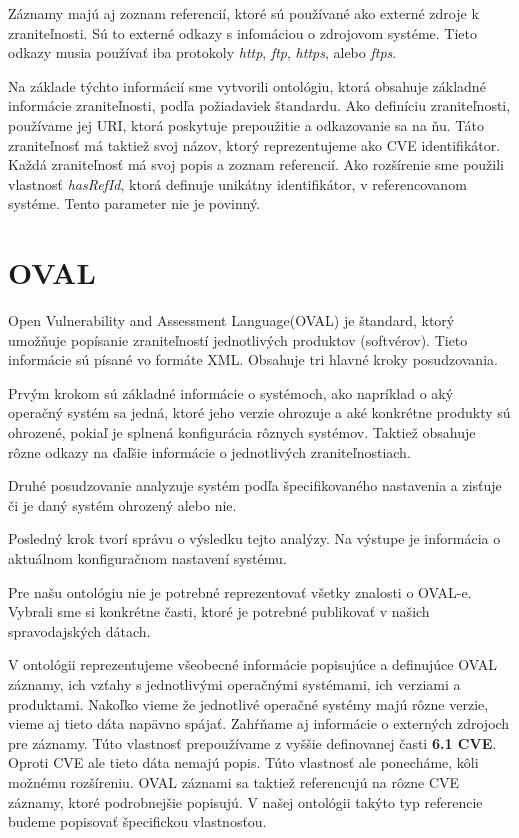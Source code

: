 \documentclass[12pt, a4paper, oneside]{book}
\begin{document}
Záznamy majú aj zoznam referencií, ktoré sú používané ako externé zdroje k zraniteľnosti. Sú to externé odkazy s infomáciou o zdrojovom systéme. Tieto odkazy musia používať iba protokoly \textit{http}, \textit{ftp}, \textit{https}, alebo \textit{ftps}.


Na základe týchto informácií sme vytvorili ontológiu, ktorá obsahuje základné informácie zraniteľnosti, podľa požiadaviek štandardu. Ako definíciu zraniteľnosti, používame jej URI, ktorá poskytuje prepoužitie a odkazovanie sa na ňu. Táto zraniteľnosť má taktiež svoj názov, ktorý reprezentujeme ako CVE identifikátor. Každá zraniteľnosť má svoj popis a zoznam referencií. Ako rozšírenie sme použili vlastnosť \textit{hasRefId}, ktorá definuje unikátny identifikátor, v referencovanom systéme. Tento parameter nie je povinný.




\section{OVAL}
Open Vulnerability and Assessment Language(OVAL) je štandard, ktorý umožňuje popísanie zraniteľností jednotlivých produktov (softvérov). Tieto informácie sú písané vo formáte XML. Obsahuje tri hlavné kroky posudzovania.


Prvým krokom sú základné informácie o systémoch, ako napríklad o aký operačný systém sa jedná, ktoré jeho verzie ohrozuje a aké konkrétne produkty sú ohrozené, pokiaľ je splnená konfigurácia rôznych systémov. Taktiež obsahuje rôzne odkazy na ďaľšie informácie o jednotlivých zraniteľnostiach. 


Druhé posudzovanie analyzuje systém podľa špecifikovaného nastavenia a zisťuje či je daný systém ohrozený alebo nie. 


Posledný krok tvorí správu o výsledku tejto analýzy. Na výstupe je informácia o aktuálnom konfiguračnom nastavení systému.


Pre našu ontológiu nie je potrebné reprezentovať všetky znalosti o OVAL-e. Vybrali sme si konkrétne časti, ktoré je potrebné publikovať v našich spravodajských dátach. 


V ontológii reprezentujeme všeobecné informácie popisujúce a definujúce OVAL záznamy, ich vzťahy s jednotlivými operačnými systémami, ich verziami a produktami. Nakoľko vieme že jednotlivé operačné systémy majú rôzne verzie, vieme aj tieto dáta napävno spájať. Zahŕňame aj informácie o externých zdrojoch pre záznamy. Túto vlastnosť prepoužívame z vyššie definovanej časti \textbf{6.1 CVE}. Oproti CVE ale tieto dáta nemajú popis. Túto vlastnosť ale ponecháme, kôli možnému rozšíreniu. OVAL záznami sa taktiež referencujú na rôzne CVE záznamy, ktoré podrobnejšie popisujú. V našej ontológii takýto typ referencie budeme popisovať špecifickou vlastnosťou.
\end{document}

